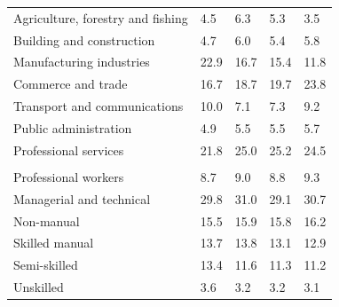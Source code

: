 \documentclass{article}
\begin{document}
\begin{table}[h]
\begin{tabular}{KTTTT}
    \hline
Agriculture, forestry and fishing  & 4.5& 6.3& 5.3& 3.5\\
Building and construction & 4.7& 6.0& 5.4& 5.8\\
Manufacturing industries & 22.9& 16.7& 15.4& 11.8\\
Commerce and trade  & 16.7& 18.7& 19.7& 23.8\\
Transport and communications  & 10.0&  7.1&  7.3&  9.2\\
Public administration & 4.9& 5.5& 5.5& 5.7\\
Professional services & 21.8& 25.0& 25.2& 24.5\\
\hline
    \\ 
    \hline
Professional workers  & 8.7& 9.0 & 8.8& 9.3\\
Managerial and technical & 29.8& 31.0& 29.1& 30.7\\
Non-manual & 15.5& 15.9& 15.8& 16.2\\
Skilled manual & 13.7& 13.8& 13.1& 12.9\\
Semi-skilled & 13.4& 11.6& 11.3& 11.2\\
Unskilled  & 3.6& 3.2& 3.2& 3.1\\
\end{tabular}
\end{table}
\pagebreak
\end{document}
